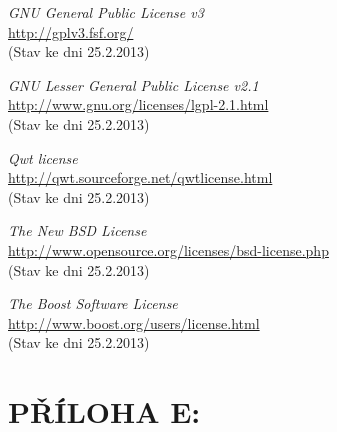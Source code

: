 \documentclass[12pt, a4paper, oneside]{article}
\newcommand{\It}{\textit}  %
\begin{document}
\begin{thebibliography}{99}
     \It{GNU General Public License v3} \\
    \url{http://gplv3.fsf.org/}\\
    (Stav ke dni 25.2.2013)

     \It{GNU Lesser General Public License v2.1} \\
    \url{http://www.gnu.org/licenses/lgpl-2.1.html}\\
    (Stav ke dni 25.2.2013)

     \It{Qwt license} \\
    \url{http://qwt.sourceforge.net/qwtlicense.html}\\
    (Stav ke dni 25.2.2013)

     \It{The New BSD License} \\
    \url{http://www.opensource.org/licenses/bsd-license.php}\\
    (Stav ke dni 25.2.2013)

     \It{The Boost Software License} \\
    \url{http://www.boost.org/users/license.html}\\
    (Stav ke dni 25.2.2013)

\end{thebibliography}

\newpage
\section*{PŘÍLOHA E:}
\listoffigures   %
\end{document}

